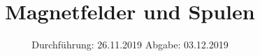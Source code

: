 

\subject{V308}
\title{Magnetfelder und Spulen}
\date{
  Durchführung: 26.11.2019
  \hspace{3em}
  Abgabe: 03.12.2019
}



\maketitle
\thispagestyle{empty}
\tableofcontents
\newpage






\newpage
\printbibliography{}
\newpage



